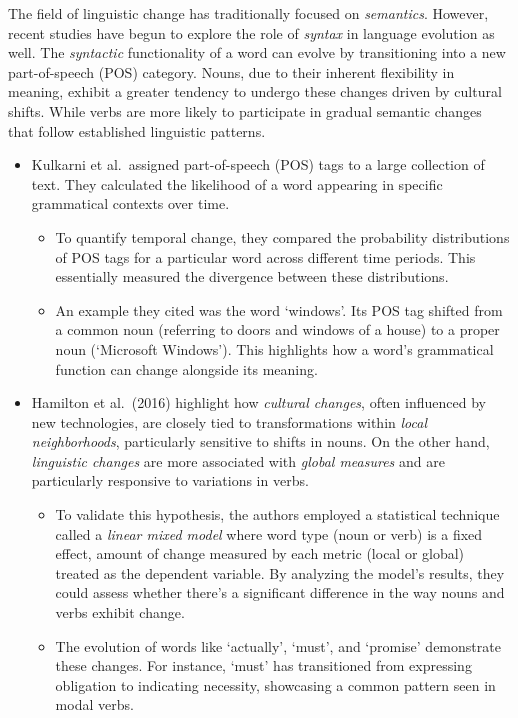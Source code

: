 The field of linguistic change has traditionally focused on \emph{semantics}.
However, recent studies have begun to explore the role of \emph{syntax} in language evolution as well.
The \emph{syntactic} functionality of a word can evolve by transitioning into a new part-of-speech (POS) category.
Nouns, due to their inherent flexibility in meaning, exhibit a greater tendency to undergo these changes driven by cultural shifts.
While verbs are more likely to participate in gradual semantic changes that follow established linguistic patterns.
\vspace{0mm}
\begin{itemize}
    \item {}
    Kulkarni et al.\ assigned part-of-speech (POS) tags to a large collection of text.
    They calculated the likelihood of a word appearing in specific grammatical contexts over time.
    \begin{itemize}
        \item To quantify temporal change, they compared the probability distributions of POS tags for a particular word across different time periods.
        This essentially measured the divergence between these distributions.
        \item An example they cited was the word `windows'.
        Its POS tag shifted from a common noun (referring to doors and windows of a house) to a proper noun (`Microsoft Windows').
        This highlights how a word's grammatical function can change alongside its meaning.
    \end{itemize}

    \item {}
     Hamilton et al.\ (2016) highlight how \emph{cultural changes}, often influenced by new technologies, are closely tied to transformations within \emph{local neighborhoods}, particularly sensitive to shifts in nouns.
     On the other hand, \emph{linguistic changes} are more associated with \emph{global measures} and are particularly responsive to variations in verbs.
     \begin{itemize}
         \item To validate this hypothesis, the authors employed a statistical technique called a \emph{linear mixed model} where word type (noun or verb) is a fixed effect,
         amount of change measured by each metric (local or global) treated as the dependent variable.
         By analyzing the model's results, they could assess whether there's a significant difference in the way nouns and verbs exhibit change.
         \item The evolution of words like `actually', `must', and `promise' demonstrate these changes.
         For instance, `must' has transitioned from expressing obligation to indicating necessity, showcasing a common pattern seen in modal verbs.
     \end{itemize}
\end{itemize}

